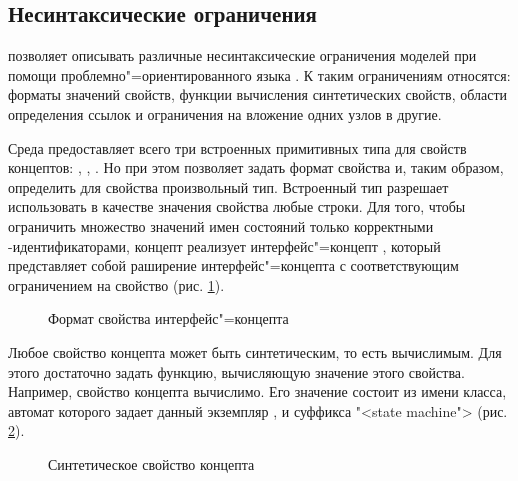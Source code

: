 \subsection{Несинтаксические ограничения}
\MPS{} позволяет описывать различные несинтаксические ограничения моделей при помощи проблемно"=ориентированного языка . К таким ограничениям относятся: форматы значений свойств, функции вычисления синтетических свойств, области определения ссылок и ограничения на вложение одних узлов в другие.

Среда \MPS{} предоставляет всего три встроенных примитивных типа для свойств концептов: , , . Но при этом позволяет задать формат свойства и, таким образом, определить для свойства произвольный тип. Встроенный тип  разрешает использовать в качестве значения свойства любые строки. Для того, чтобы ограничить множество значений имен состояний только корректными -идентификаторами, концепт  реализует интерфейс"=концепт , который представляет собой раширение интерфейс"=концепта  с соответствующим ограничением на свойство  (рис. \ref{fig:PropertyIsValid}).

\begin{figure}
 \centering
 \caption{Формат свойства  интерфейс"=концепта }
 \label{fig:PropertyIsValid}
\end{figure}

Любое свойство концепта может быть синтетическим, то есть вычислимым. Для этого достаточно задать функцию, вычисляющую значение этого свойства. Например, свойство  концепта  вычислимо. Его значение состоит из имени класса, автомат которого задает данный экземпляр , и суффикса "<state machine"> (рис. \ref{fig:PropertyGet}).

\begin{figure}
 \centering
 \caption{Синтетическое свойство  концепта }
 \label{fig:PropertyGet}
\end{figure}
